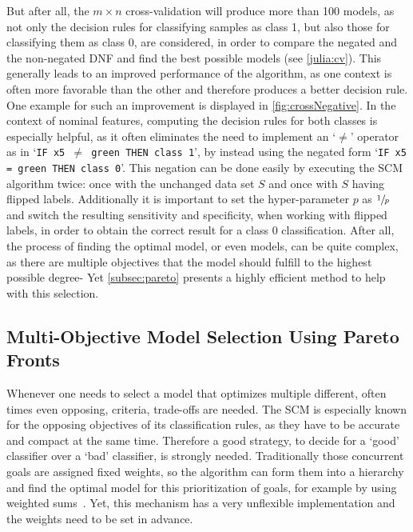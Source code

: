 But after all, the \(m \times n\) cross-validation will produce more than 100 models,
as not only the decision rules for classifying samples as class 1, but also those for
classifying them as class 0, are considered, in order to compare the negated and the non-negated DNF and find the best possible models (see \autoref{julia:cv}).
This generally leads to an improved performance of the algorithm, as one context is often more favorable
than the other and therefore produces a better decision rule.
One example for such an improvement is displayed in \autoref{fig:crossNegative}.
In the context of nominal features, computing the decision rules for both classes is especially helpful, as
it often eliminates the need to implement an `\(\neq\)' operator as in `\texttt{IF x5 \(\neq\) green THEN class 1}', by instead using
the negated form `\texttt{IF x5 = green THEN class 0}'.
This negation can be done easily by executing the SCM algorithm twice: once with the unchanged data set \(S\)
and once with \(S\) having flipped labels.
Additionally it is important to set the hyper-parameter \(p\) as \(\sfrac{1}{p}\) and
switch the resulting sensitivity and specificity, when working with flipped labels,
in order to obtain the correct result for a class 0 classification.
After all, the process of finding the optimal model, or even models, can be quite complex, as there are multiple
objectives that the model should fulfill to the highest possible degree-
Yet \autoref{subsec:pareto} presents a highly efficient method to help with this selection.

\subsection{Multi-Objective Model Selection Using Pareto Fronts}\label{subsec:pareto}

Whenever one needs to select a model that optimizes multiple different, often times even opposing, criteria, trade-offs are needed.
The SCM is especially known for the opposing objectives of its classification rules, as they
have to be accurate and compact at the same time.
Therefore a good strategy, to decide for a `good' classifier over a `bad' classifier, is strongly needed.
Traditionally those concurrent goals are assigned fixed weights, so the algorithm can form them into a
hierarchy and find the optimal model for this prioritization of goals, for example by using weighted sums~\citep{muessel}.
Yet, this mechanism has a very unflexible implementation and the weights need to be set in advance.

